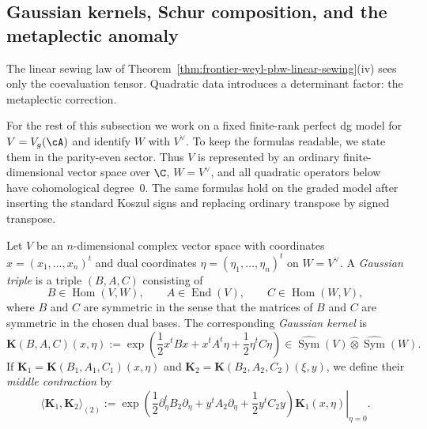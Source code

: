 \subsection{Gaussian kernels, Schur composition, and the metaplectic anomaly}
\label{subsec:frontier-metaplectic-gaussian-kernels}

The linear sewing law of
Theorem~\ref{thm:frontier-weyl-pbw-linear-sewing}(iv) sees only the coevaluation tensor.
Quadratic data introduces a determinant factor: the metaplectic correction.

\begin{convention}
\label{conv:frontier-quadratic-gaussian-sector}
For the rest of this subsection we work on a fixed finite-rank perfect dg model
for $V=V_g(\cA)$ and identify $W$ with $V^\vee$.
To keep the formulas readable, we state them in the parity-even sector.
Thus $V$ is represented by an ordinary finite-dimensional vector space over
$\C$, $W=V^\vee$, and all quadratic operators below have cohomological degree~$0$.
The same formulas hold on the graded model after inserting the standard Koszul
signs and replacing ordinary transpose by signed transpose.
\end{convention}

\begin{definition}
\label{def:frontier-gaussian-triple-kernel}
Let $V$ be an $n$-dimensional complex vector space with coordinates
$x=(x_1,\dots,x_n)^t$ and dual coordinates $\eta=(\eta_1,\dots,\eta_n)^t$ on
$W=V^\vee$.
A \emph{Gaussian triple} is a triple $(B,A,C)$ consisting of
\begin{equation}\label{eq:frontier-gaussian-triple-data}
B\in\operatorname{Hom}(V,W),
\qquad
A\in\operatorname{End}(V),
\qquad
C\in\operatorname{Hom}(W,V),
\end{equation}
where $B$ and $C$ are symmetric in the sense that the matrices of $B$ and $C$
are symmetric in the chosen dual bases.
The corresponding \emph{Gaussian kernel} is
\begin{equation}\label{eq:frontier-gaussian-kernel}
\mathbf K(B,A,C)(x,\eta)
:=
\exp\!\left(
\frac12 x^t Bx + x^t A^t\eta + \frac12 \eta^t C\eta
\right)
\in
\widehat{\operatorname{Sym}}(V)\widehat\otimes \widehat{\operatorname{Sym}}(W).
\end{equation}
If $\mathbf K_1=\mathbf K(B_1,A_1,C_1)(x,\eta)$ and
$\mathbf K_2=\mathbf K(B_2,A_2,C_2)(\xi,y)$,
we define their \emph{middle contraction} by
\begin{equation}\label{eq:frontier-middle-contraction-definition}
\langle \mathbf K_1,\mathbf K_2\rangle_{(2)}
:=
\left.
\exp\!\left(
\frac12 \partial_\eta^t B_2\partial_\eta + y^t A_2\partial_\eta
+\frac12 y^t C_2 y
\right)
\mathbf K_1(x,\eta)
\right|_{\eta=0}.
\end{equation}
\end{definition}

